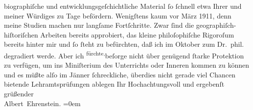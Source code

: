 \begin{ledgroupsized}[t]{13cm}
                    biographiſche und entwicklungsgeſchichtliche Material ſo ſchnell etwa Ihrer und
                    meiner Würdiges zu Tage befördern. Wenigſtens kaum vor März 1911,
                    denn meine Studien machen nur langſame Fortſchritte. Zwar ſind die
                    geographiſch-hiſtoriſchen Arbeiten bereits approbiert, das kleine philoſophiſche
                    Rigoroſum bereits hinter mir und ſo ſteht zu befürchten, daß ich im
                        Oktober zum Dr. phil. degradiert werde. Aber ich \substVorne{}\textsuperscript{fürchte,}{\allowbreak}\substDazwischen{}beſorge\substHinten{} nicht über genügend ſtarke Protektion zu verfügen, um ins Miniſterium des Unterrichts oder Inneren kommen zu können und es müßte alſo im
                        Jänner{ }ſchreckliche, überdies nicht gerade viel
                    Chancen bietende Lehramtsprüfungen ablegen\pend
           \pstart
           Ihr Hochachtungsvoll und ergebenſt grüßender{\\[\baselineskip]}\spacefill\mbox{Albert Ehrenstein.}\pend
           \leftskip=0em{}
         
         \endnumbering{}\end{ledgroupsized}  \newcommand{\dateiname}{L01946}\newcommand{\titel}{Albert Ehrenstein an Arthur Schnitzler, 12. 7. 1910}\newcommand{\editorInnen}{Martin Anton Müller und Gerd-Hermann Susen}
      
